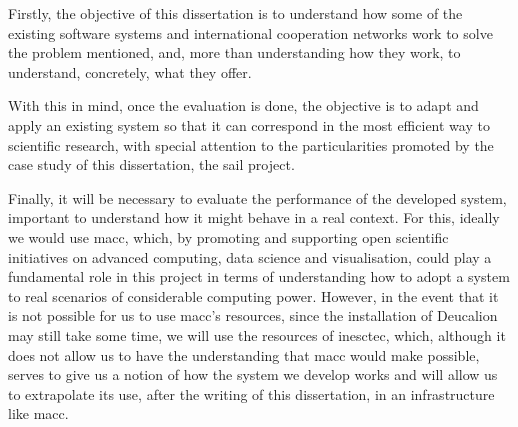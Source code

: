 Firstly, the objective of this dissertation is to understand how some of the existing software systems and international cooperation networks work to solve the problem mentioned, and, more than understanding how they work, to understand, concretely, what they offer.

With this in mind, once the evaluation is done, the objective is to adapt and apply an existing system so that it can correspond in the most efficient way to scientific research, with special attention to the particularities promoted by the case study of this dissertation, the \gls{sail} project.

Finally, it will be necessary to evaluate the performance of the developed system, important to understand how it might behave in a real context. For this, ideally we would use \gls{macc}, which, by promoting and supporting open scientific initiatives on advanced computing, data science and visualisation, could play a fundamental role in this project in terms of understanding how to adopt a system to real scenarios of considerable computing power. However, in the event that it is not possible for us to use \gls{macc}'s resources, since the installation of Deucalion may still take some time, we will use the resources of \gls{inesctec}, which, although it does not allow us to have the understanding that \gls{macc} would make possible, serves to give us a notion of how the system we develop works and will allow us to extrapolate its use, after the writing of this dissertation, in an infrastructure like \gls{macc}.